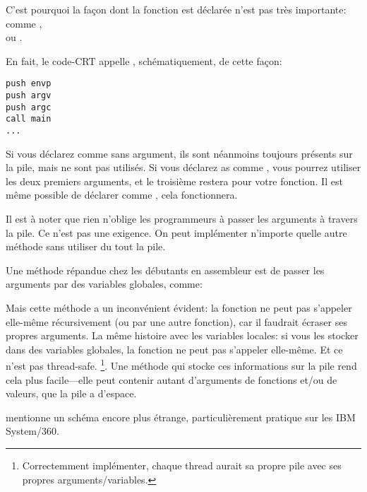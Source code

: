 \par
C'est pourquoi la façon dont la fonction \main est déclarée n'est pas très importante:
comme \main, \\ ou .

En fait, le code-\ac{CRT} appelle \main, schématiquement, de cette façon:
	
\begin{lstlisting}[style=customasmx86]
push envp
push argv
push argc
call main
...
\end{lstlisting}

Si vous déclarez \main comme \main sans argument, ils sont néanmoins toujours présents
sur la pile, mais ne sont pas utilisés.
Si vous déclarez \main as comme ,
vous pourrez utiliser les deux premiers arguments, et le troisième restera 
pour votre fonction.
Il est même possible de déclarer \main comme , cela fonctionnera.


Il est à noter que rien n'oblige les programmeurs à passer les arguments à travers
la pile. Ce n'est pas une exigence.
On peut implémenter n'importe quelle autre méthode sans utiliser du tout la pile.

Une méthode répandue chez les débutants en assembleur est de passer les arguments
par des variables globales, comme:



Mais cette méthode a un inconvénient évident: la fonction 
ne peut pas s'appeler elle-même récursivement (ou par une autre fonction),
car il faudrait écraser ses propres arguments.
La même histoire avec les variables locales: si vous les stocker dans des variables
globales, la fonction ne peut pas s'appeler elle-même.
Et ce n'est pas thread-safe.
\footnote{Correctemment implémenter, chaque thread aurait sa propre pile avec ses propres arguments/variables.}.
Une méthode qui stocke ces informations sur la pile rend cela plus facile---elle
peut contenir autant d'arguments de fonctions et/ou de valeurs, que la pile a d'espace.

 mentionne un schéma encore plus étrange, particulièrement
pratique sur les IBM System/360.



